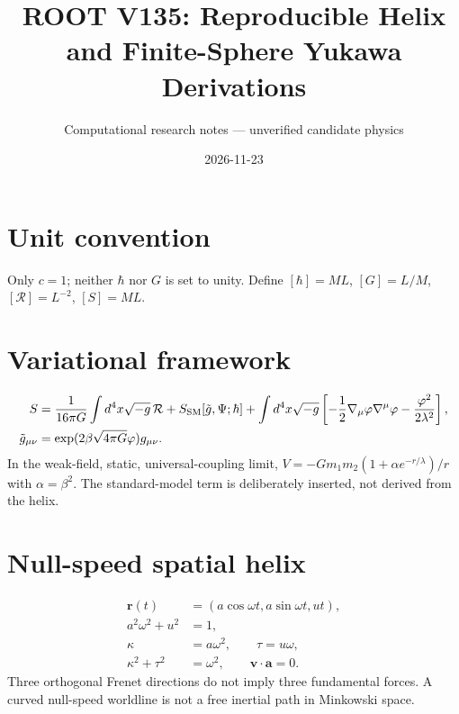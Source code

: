 \documentclass[11pt]{article}
\begin{document}
\title{ROOT V135: Reproducible Helix and Finite-Sphere Yukawa Derivations}
\author{Computational research notes --- unverified candidate physics}
\date{2026-11-23}
\maketitle
\section{Unit convention}
Only $c=1$; neither $\hbar$ nor $G$ is set to unity. Define $[\hbar]=ML$, $[G]=L/M$, $[\mathcal R]=L^{-2}$, $[S]=ML$.
\section{Variational framework}
\begin{align}
S &= \frac{1}{16\pi G}\int d^4x\sqrt{-g}\,\mathcal R + S_{\rm SM}[\tilde g,\Psi;\hbar]
+\int d^4x\sqrt{-g}\left[-\frac12\nabla_\mu\varphi\nabla^\mu\varphi-\frac{\varphi^2}{2\lambda^2}\right],\\
\tilde g_{\mu\nu}&=\exp(2\beta\sqrt{4\pi G}\varphi)g_{\mu\nu}.
\end{align}
In the weak-field, static, universal-coupling limit,
$V=-Gm_1m_2(1+\alpha e^{-r/\lambda})/r$ with $\alpha=\beta^2$.
The standard-model term is deliberately inserted, not derived from the helix.
\section{Null-speed spatial helix}
\begin{align}
\mathbf r(t)&=(a\cos\omega t,a\sin\omega t,ut),\\
a^2\omega^2+u^2&=1,\\
\kappa&=a\omega^2,\qquad\tau=u\omega,\\
\kappa^2+\tau^2&=\omega^2,\qquad\mathbf v\cdot\mathbf a=0.
\end{align}
Three orthogonal Frenet directions do not imply three fundamental forces.
A curved null-speed worldline is not a free inertial path in Minkowski space.
\end{document}
